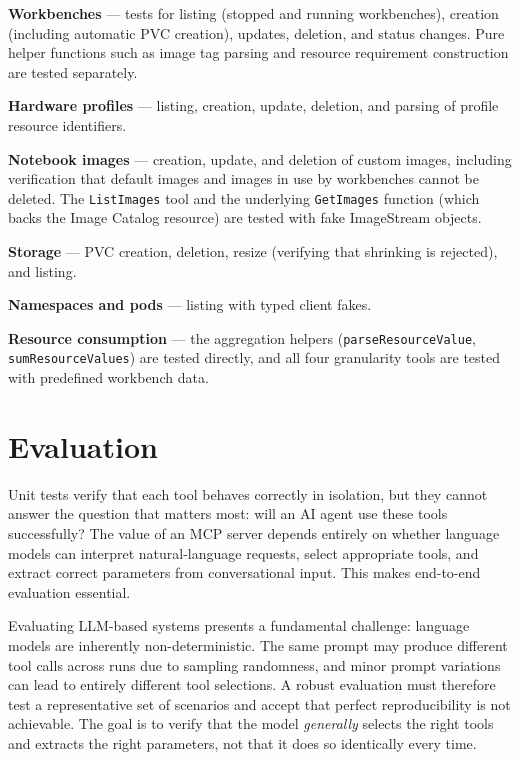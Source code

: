 \documentclass[
  digital,     %
  oneside,     %
  nosansbold,  %
  nocolorbold, %
  lof,         %
  lot,         %
]{fithesis4}
\begin{document}
\begin{compactitem}
  \item \textbf{Workbenches} --- tests for listing (stopped and running
        workbenches), creation (including automatic PVC creation), updates,
        deletion, and status changes. Pure helper
        functions such as image tag parsing and resource requirement
        construction are tested separately.
  \item \textbf{Hardware profiles} --- listing, creation, update, deletion,
        and parsing of profile resource identifiers.
  \item \textbf{Notebook images} --- creation, update, and deletion of
        custom images, including verification that default images and
        images in use by workbenches cannot be deleted. The
        \texttt{ListImages} tool and the underlying \texttt{GetImages}
        function (which backs the Image Catalog resource) are tested with
        fake ImageStream objects.
  \item \textbf{Storage} --- PVC creation, deletion, resize (verifying
        that shrinking is rejected), and listing.
  \item \textbf{Namespaces and pods} --- listing with typed client fakes.
  \item \textbf{Resource consumption} --- the aggregation helpers
        (\texttt{parse\-Resource\-Value}, \texttt{sum\-Resource\-Values}) are
        tested directly, and all four granularity tools are tested
        with predefined workbench data.
\end{compactitem} 

\section{Evaluation}
\label{sec:evaluation}

Unit tests verify that each tool behaves correctly in isolation, but they
cannot answer the question that matters most: will an AI agent use
these tools successfully? The value of an MCP server depends entirely on
whether language models can interpret natural-language requests, select
appropriate tools, and extract correct parameters from conversational input.
This makes end-to-end evaluation essential.

Evaluating LLM-based systems presents a fundamental challenge: language models
are inherently non-deterministic. The same prompt may produce different tool
calls across runs due to sampling randomness, and minor prompt variations can
lead to entirely different tool selections. A robust evaluation must therefore
test a representative set of scenarios and accept that perfect reproducibility
is not achievable. The goal is to verify that the model \emph{generally}
selects the right tools and extracts the right parameters, not that it does so
identically every time.
\end{document}
